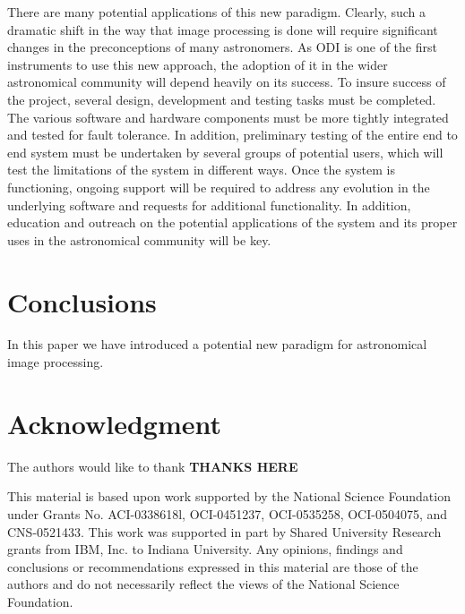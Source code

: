 \documentclass[10pt,conference]{IEEEtran}
\begin{document}
There are many potential applications of this new paradigm. Clearly, such a dramatic shift in the way that image processing is done will require significant changes in the preconceptions of many astronomers. As ODI is one of the first instruments to use this new approach, the adoption of it in the wider astronomical community will depend heavily on its success. To insure success of the project, several design, development and testing tasks must be completed. The various software and hardware components must be more tightly integrated and tested for fault tolerance. In addition, preliminary testing of the entire end to end system must be undertaken by several groups of potential users, which will test the limitations of the system in different ways. Once the system is functioning, ongoing support will be required to address any evolution in the underlying software and requests for additional functionality. In addition, education and outreach on the potential applications of the system and its proper uses in the astronomical community will be key. 

\section{Conclusions}\label{sec:conclusions}

In this paper we have introduced a potential new paradigm for astronomical image processing. 

\section*{Acknowledgment}

The authors would like to thank {\bf THANKS HERE}

This material is based upon work supported by the National Science Foundation under Grants No. ACI-0338618l, OCI-0451237, OCI-0535258, OCI-0504075, and CNS-0521433. This work was supported in part by Shared University Research grants from IBM, Inc. to Indiana University. Any opinions, findings and conclusions or recommendations expressed in this material are those of the authors and do not necessarily reflect the views of the National Science Foundation. 





\end{document}
